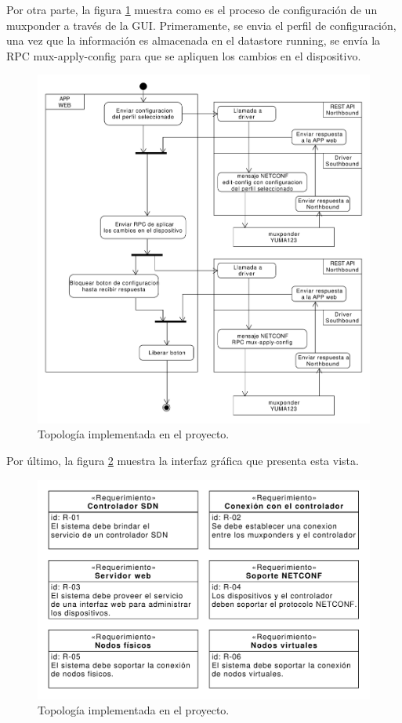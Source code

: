\begin{itemize}
    Por otra parte, la figura \ref{fig:config_disp_web} muestra como es el proceso de configuración de un muxponder a través de la GUI. Primeramente, se envia el perfil de configuración, una vez que la información es almacenada en el datastore running, se envía la RPC mux-apply-config para que se apliquen los cambios en el dispositivo.

    \begin{figure}[H]
        \centering
        \includegraphics[scale=0.40]{Figures/config_disp_web.pdf}
        \caption{Topología implementada en el proyecto.}
        \label{fig:config_disp_web}
      \end{figure}

    Por último, la figura \ref{fig:captura_web_principal} muestra la interfaz gráfica que presenta esta vista.

      \begin{figure}[H]
        \centering
        \includegraphics[scale=0.65]{Figures/req_sys.pdf}
        \caption{Topología implementada en el proyecto.}
        \label{fig:captura_web_principal}
      \end{figure}


\end{itemize}
